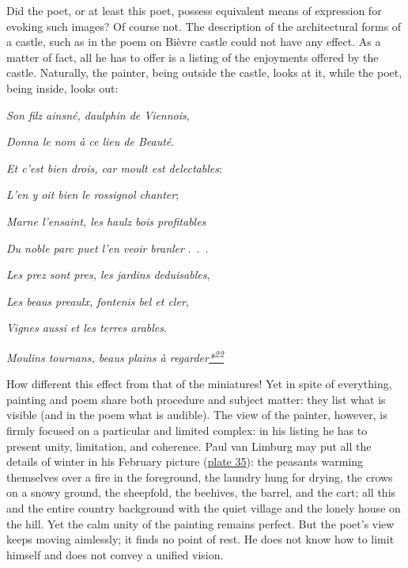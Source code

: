 Did the poet, or at least this poet, possess equivalent means of
expression for evoking such images? Of course not. The description of
the architectural forms of a castle, such as in the poem on Bièvre
castle could not have any effect. As a matter of fact, all he has to
offer is a listing of the enjoyments offered by the castle. Naturally,
the painter, being outside the castle, looks at it, while the poet,
being inside, looks out:

\emph{\protect\hypertarget{21_Chapter_Thirteen__IMAGE_AND_WORD.xhtmlux5cux23page_353}{}{}Son
filz ainsné, daulphin de Viennois},

\emph{Donna le nom à ce lieu de Beauté}.

\emph{Et c'est bien drois, car moult est delectables}:

\emph{L'en y oit bien le rossignol chanter};

\emph{Marne l'ensaint, les haulz bois profitables}

\emph{Du noble parc puet l'en veoir branler} .~.~.

\emph{Les prez sont pres, les jardins deduisables},

\emph{Les beaus preaulx, fontenis bel et cler},

\emph{Vignes aussi et les terres arables}.

\emph{Moulins tournans, beaus plains à
regarder\protect\hypertarget{21_Chapter_Thirteen__IMAGE_AND_WORD.xhtmlux5cux23id_2737}{\protect\hyperlink{23_NOTES.xhtmlux5cux23id_2738}{*\textsuperscript{22}}}}

How different this effect from that of the miniatures! Yet in spite of
everything, painting and poem share both procedure and subject matter:
they list what is visible (and in the poem what is audible). The view of
the painter, however, is firmly focused on a particular and limited
complex: in his listing he has to present unity, limitation, and
coherence. Paul van Limburg may put all the details of winter in his
February picture
(\protect\hyperlink{20_ILLUSTRATIONS_FOLLOW_PAGE.xhtmlux5cux23id_2302}{plate
35}): the peasants warming themselves over a fire in the foreground, the
laundry hung for drying, the crows on a snowy ground, the sheepfold, the
beehives, the barrel, and the cart; all this and the entire country
background with the quiet village and the lonely house on the hill. Yet
the calm unity of the painting remains perfect. But the poet's view
keeps moving aimlessly; it finds no point of rest. He does not know how
to limit himself and does not convey a unified vision.

